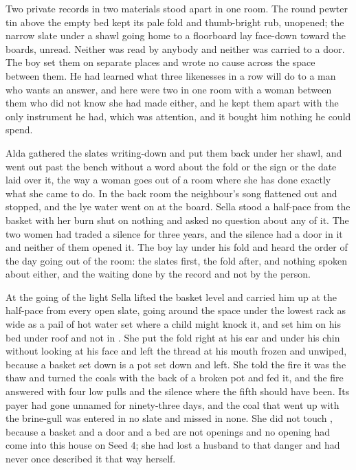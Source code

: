 Two private records in two materials stood apart in one room. The round pewter tin above the empty bed kept its pale fold and thumb-bright rub, unopened; the narrow slate under a shawl going home to a floorboard lay face-down toward the boards, unread. Neither was read by anybody and neither was carried to a door. The boy set them on separate places and wrote no cause across the space between them. He had learned what three likenesses in a row will do to a man who wants an answer, and here were two in one room with a woman between them who did not know she had made either, and he kept them apart with the only instrument he had, which was attention, and it bought him nothing he could spend.

\scenebreak

Alda gathered the slates writing-down and put them back under her shawl, and went out past the bench without a word about the fold or the sign or the date laid over it, the way a woman goes out of a room where she has done exactly what she came to do. In the back room the neighbour's song flattened out and stopped, and the lye water went on at the board. Sella stood a half-pace from the basket with her burn shut on nothing and asked no question about any of it. The two women had traded a silence for three years, and the silence had a door in it and neither of them opened it. The boy lay under his fold and heard the order of the day going out of the room: the slates first, the fold after, and nothing spoken about either, and the waiting done by the record and not by the person.

At the going of the light Sella lifted the basket level and carried him up at the half-pace from every open slate, going around the space under the lowest rack as wide as a pail of hot water set where a child might knock it, and set him on his bed under  roof and not in . She put the fold right at his ear and under his chin without looking at his face and left the thread at his mouth frozen and unwiped, because a basket set down is a pot set down and left. She told the fire it was the thaw and turned the coals with the back of a broken pot and fed it, and the fire answered with four low pulls and the silence where the fifth should have been. Its payer had gone unnamed for ninety-three days, and the coal that went up with the brine-gull was entered in no slate and missed in none. She did not touch , because a basket and a door and a bed are not openings and no opening had come into this house on Seed 4; she had lost a husband to that danger and had never once described it that way herself.

